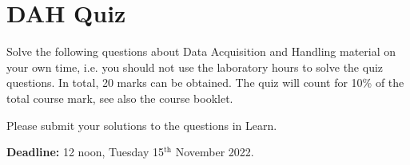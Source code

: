 \chapter{DAH Quiz}
\label{sec:quiz}

Solve the following questions about Data Acquisition and Handling material on your own time,
i.e. you should not use the laboratory hours to solve the quiz questions. 
In total, 20 marks can be obtained.
The quiz will count for 10\% of the total course mark, see also the course booklet.

Please submit your solutions to the questions in Learn.

{\bf Deadline:} 12 noon, Tuesday 15$^\mathrm{th}$ November 2022.

